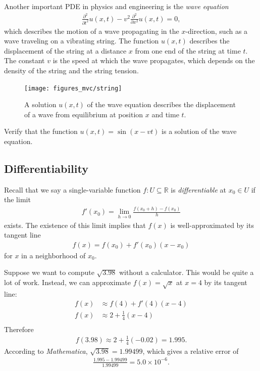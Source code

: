 \documentclass[12pt,letterpaper,reqno]{article}
\numberwithin{equation}{section}
\newcommand{\R}{\ensuremath{\mathbb R}}
\begin{document}
{Another important PDE in physics and engineering is the \emph{wave equation}
\begin{align*}
	\frac{\partial^2}{\partial t^2}u(x,t)-v^2\frac{\partial^2}{\partial x^2}u(x,t)=0,
\end{align*}
which describes the motion of a wave propagating in the $x$-direction, such as a wave traveling on a vibrating string. The function $u(x,t)$ describes the displacement of the string at a distance $x$ from one end of the string at time $t$. The constant $v$ is the speed at which the wave propagates, which depends on the density of the string and the string tension.

\begin{figure}[h]
	\begin{center}
		\texttt{[image: figures\_mvc/string]}
	\end{center}
\caption{A solution $u(x,t)$ of the wave equation describes the displacement of a wave from equilibrium at position $x$ and time $t$.}
\end{figure}

\begin{exercise}
Verify that the function $u(x,t)=\sin(x-vt)$ is a solution of the wave equation.	
\end{exercise}



\subsection{Differentiability}
Recall that we say a single-variable function $f:U \subseteq \R$ is \emph{differentiable} at $x_0 \in U$ if the limit
\begin{align}\label{eq:old_derivative}
	f'(x_0)=\lim_{h \to 0}\frac{f(x_0+h)-f(x_0)}{h}
\end{align}
exists. The existence of this limit implies that $f(x)$ is well-approximated by its tangent line
\begin{align*}
	f(x)=f(x_0)+f'(x_0)(x-x_0)
\end{align*}
for $x$ in a neighborhood of $x_0$.

\begin{example}
Suppose we want to compute $\sqrt{3.98}$ without a calculator. This would be quite a lot of work. Instead, we can approximate $f(x)=\sqrt{x}$ at $x=4$ by its tangent line:
\begin{align*}
	f(x)&\approx f(4)+f'(4)(x-4) \\
	f(x)&\approx 2+\frac{1}{4}(x-4) \\
\end{align*}
Therefore
\begin{align*}
	f(3.98)\approx 2+\frac{1}{4}(-0.02)=1.995.
\end{align*}
According to \emph{Mathematica}, $\sqrt{3.98}=1.99499$, which gives a relative error of
\begin{align*}
	\frac{1.995-1.99499}{1.99499}=5.0 \times 10^{-6}.
\end{align*}	
\end{example}

}
\end{document}
